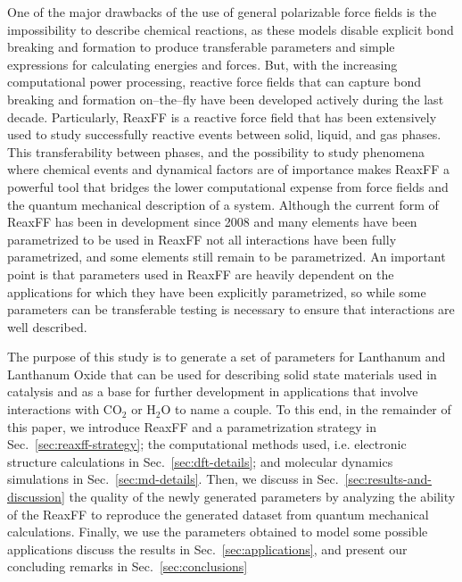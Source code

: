 \documentclass[journal=jpcafh,manuscript=article]{achemso}
\begin{document}
One of the major drawbacks of the use of general polarizable force fields is the impossibility to describe chemical reactions, as these models disable explicit bond breaking and formation to produce transferable parameters and simple expressions for calculating energies and forces.
But, with the increasing computational power processing, reactive force fields that can capture bond breaking and formation on--the--fly have been developed actively during the last decade.
Particularly, ReaxFF is a reactive force field that has been extensively used to study successfully reactive events between solid, liquid, and gas phases.
This transferability between phases, and the possibility to study phenomena where chemical events and dynamical factors are of importance makes ReaxFF a powerful tool that bridges the lower computational expense from force fields and the quantum mechanical description of a system.
Although the current form of ReaxFF has been in development since 2008 \cite{chenoweth_reaxff_2008} and many elements have been parametrized to be used in ReaxFF not all interactions have been fully parametrized, and some elements still remain to be parametrized.
An important point is that parameters used in ReaxFF are heavily dependent on the applications for which they have been explicitly parametrized, so while some parameters can be transferable testing is necessary to ensure that interactions are well described.

The purpose of this study is to generate a set of parameters for Lanthanum and Lanthanum Oxide that can be used for describing solid state materials used in catalysis and as a base for further development in applications that involve interactions with CO$_2$ or H$_2$O to name a couple.
To this end, in the remainder of this paper, we introduce ReaxFF and a parametrization strategy in Sec.~\ref{sec:reaxff-strategy}; the computational methods used, i.e. electronic structure calculations in Sec.~\ref{sec:dft-details}; and molecular dynamics simulations in Sec.~\ref{sec:md-details}.
Then, we discuss in Sec.~\ref{sec:results-and-discussion} the quality of the newly generated parameters by analyzing the ability of the ReaxFF to reproduce the generated dataset from quantum mechanical calculations.
Finally, we use the parameters obtained to model some possible applications discuss the results in Sec.~\ref{sec:applications}, and present our concluding remarks in Sec.~\ref{sec:conclusions}

%
%
\end{document}
